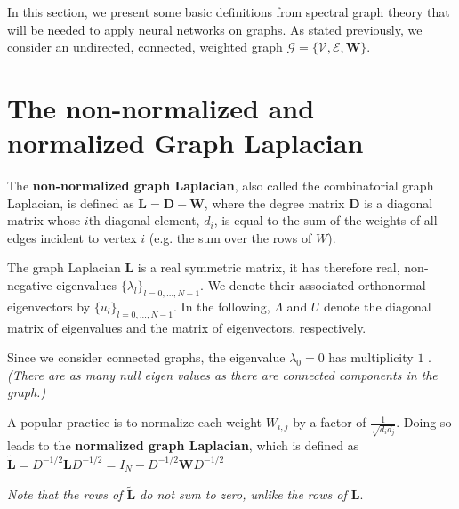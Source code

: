 \documentclass[sigconf]{acmart}
\begin{document}

In this section, we present some basic definitions from spectral graph theory that will be needed to apply neural networks on graphs. As stated previously, we consider an undirected, connected, weighted graph $\mathcal{G} = \{\mathcal{V}, \mathcal{E}, \mathbf{W}\}$. 

\section{The non-normalized and normalized Graph Laplacian}
The \textbf{non-normalized graph Laplacian}, also called the combinatorial graph Laplacian, is defined 
as $\mathbf{L} = \mathbf{D}-\mathbf{W}$, where the degree matrix $\mathbf{D}$ 
is a diagonal matrix 
whose $i$th diagonal element, $d_i$, is equal to the sum of the weights of all edges incident to vertex $i$
(e.g. the sum over the rows of ${W}$).

The graph Laplacian $\mathbf{L}$ is a real symmetric matrix, it has therefore real, non-negative eigenvalues $\{\lambda_l\}_{l=0, \dots, N-1}$. 
We denote their associated  orthonormal eigenvectors by $\{u_l\}_{l=0,\dots, N-1}$. In the following, $\Lambda$ and $U$ denote the diagonal matrix of eigenvalues and the matrix of eigenvectors, respectively.

Since we consider connected graphs, the eigenvalue $\lambda_0=0$ has multiplicity $1$  \cite{shuman_emerging_2013}. 
\textit{(There are as many null eigen values as there are connected components in the graph.)}

A popular practice is to normalize each weight $W_{i, j}$ by a factor of $\frac{1}{\sqrt{d_id_j}}$.
Doing so leads to the \textbf{normalized graph Laplacian}, which is defined as $\widetilde{\mathbf{L}} = D^{-1/2}\mathbf{L}D^{-1/2} = I_N - D^{-1/2}\mathbf{W}D^{-1/2}$

\textit{Note that the rows of  $\widetilde{\mathbf{L}}$ do not sum to zero, unlike the rows of $\mathbf{L}$}.
\end{document}
